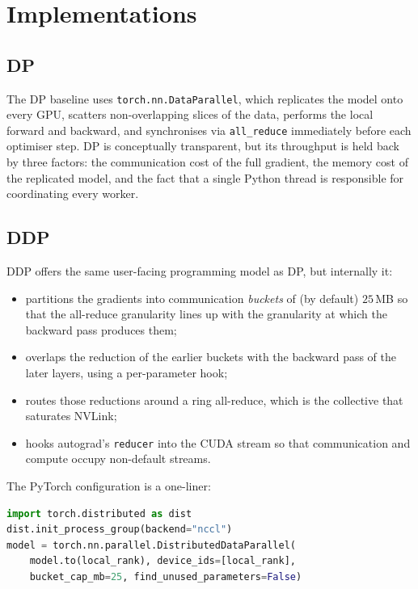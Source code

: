 \section{Implementations}\label{sec:dist_impl}

\subsection{DP}\label{sec:impl_dp}
The DP baseline uses \texttt{torch.nn.DataParallel}, which
replicates the model onto every GPU, scatters non-overlapping
slices of the data, performs the local forward and backward, and
synchronises via \texttt{all\_reduce} immediately before each
optimiser step. DP is conceptually transparent, but its throughput
is held back by three factors: the communication cost of the full
gradient, the memory cost of the replicated model, and the fact
that a single Python thread is responsible for coordinating every
worker.

\subsection{DDP}\label{sec:impl_ddp}
DDP offers the same user-facing programming model as DP, but
internally it:
\begin{itemize}
    \item partitions the gradients into communication \emph{buckets}
          of (by default) $25$\,MB so that the all-reduce
          granularity lines up with the granularity at which the
          backward pass produces them;
    \item overlaps the reduction of the earlier buckets with the
          backward pass of the later layers, using a per-parameter
          hook;
    \item routes those reductions around a ring all-reduce, which
          is the collective that saturates NVLink;
    \item hooks autograd's \texttt{reducer} into the CUDA stream so
          that communication and compute occupy non-default streams.
\end{itemize}
The PyTorch configuration is a one-liner:
\begin{lstlisting}[language=Python]
import torch.distributed as dist
dist.init_process_group(backend="nccl")
model = torch.nn.parallel.DistributedDataParallel(
    model.to(local_rank), device_ids=[local_rank],
    bucket_cap_mb=25, find_unused_parameters=False)
\end{lstlisting}

